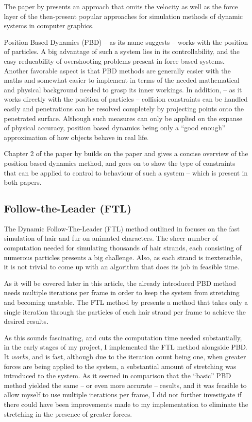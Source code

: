\documentclass[sigplan,screen,nonacm]{acmart}
\begin{document}
The paper by \citet{MullerPBD} presents an approach that omits the velocity as
well as the force layer of the then-present popular approaches for simulation
methods of dynamic systems in computer graphics.

Position Based Dynamics (PBD) -- as its name suggests -- works with the position
of particles. A big advantage of such a system lies in its controllability, and
the easy reducability of overshooting problems present in force based systems.
Another favorable aspect is that PBD methods are generally easier with the maths
and somewhat easier to implement in terms of the needed mathematical and
physical background needed to grasp its inner workings. In addition, -- as it
works directly with the position of particles -- collision constraints can be
handled easily and penetrations can be resolved completely by projecting points
onto the penetrated surface. Although such measures can only be applied on the
expanse of physical accuracy, position based dynamics being only a ``good
enough'' approximation of how objects behave in real life.

Chapter 2 of the paper by \citet{UmenhofferSimulation} builds on the
\citet{MullerPBD} paper and gives a concise overview of the position based
dynamics method, and goes on to show the type of constraints that can be applied
to control to behaviour of such a system -- which is present in both papers.


\subsection{Follow-the-Leader (FTL)}
The Dynamic Follow-The-Leader (FTL) method outlined in \citet{FTLHair} focuses
on the fast simulation of hair and fur on animated characters. The sheer number
of computation needed for simulating thousands of hair strands, each consisting
of numerous particles presents a big challenge. Also, as each strand is
inextensible, it is not trivial to come up with an algorithm that does its job
in feasible time. 

As it will be covered later in this article, the already introduced PBD method
needs multiple iterations per frame in order to keep the system from stretching
and becoming unstable. The FTL method by \citet{FTLHair} presents a method that
takes only a single iteration through the particles of each hair strand per
frame to achieve the desired results.

As this sounds fascinating, and cuts the computation time needed substantially,
in the early stages of my project, I implemented the FTL method alongside PBD.
It \textit{works}, and is fast, although due to the iteration count being one,
when greater forces are being applied to the system, a substantial amount of
stretching was introduced to the system. As it seemed in comparison that the
``basic'' PBD method yielded the same -- or even more accurate -- results, and
it was feasible to allow myself to use multiple iterations per frame, I did
not further investigate if there could have been improvements made to my
implementation to eliminate the stretching in the presence of greater forces.
\end{document}
